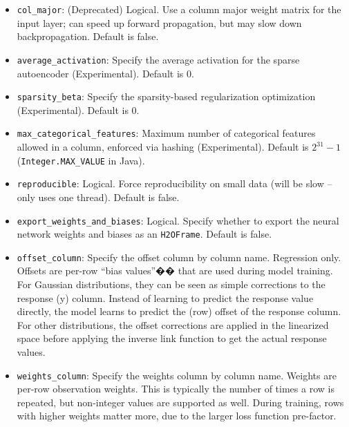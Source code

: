 \begin{itemize}
\item \texttt{col\_major}: (Deprecated) Logical. Use a column major weight matrix for the input layer; can speed up forward propagation, but may slow down backpropagation. Default is false.

\item \texttt{average\_activation}: Specify the average activation for the sparse autoencoder (Experimental).
Default is 0.

\item \texttt{sparsity\_beta}: Specify the sparsity-based regularization optimization (Experimental).  Default is 0. 

\item \texttt{max\_categorical\_features}:  Maximum number of categorical features allowed in a column, enforced via hashing (Experimental).  Default is $2^{31}-1$ (\texttt{Integer.MAX\_VALUE} in Java).

\item \texttt{reproducible}: Logical. Force reproducibility on small data (will be slow -- only uses one thread).  Default is false.

\item \texttt{export\_weights\_and\_biases}: Logical. Specify whether to export the neural network weights and biases as an \texttt{H2OFrame}.  Default is false.

%

\item \texttt{offset\_column}:  Specify the offset column by column name.  Regression only.  Offsets are per-row ``bias values''�� that are used during model training. For Gaussian distributions, they can be seen as simple corrections to the response (y) column. Instead of learning to predict the response value directly, the model learns to predict the (row) offset of the response column. For other distributions, the offset corrections are applied in the linearized space before applying the inverse link function to get the actual response values. 

\item \texttt{weights\_column}: Specify the weights column by column name. Weights are per-row observation weights. This is typically the number of times a row is repeated, but non-integer values are supported as well. During training, rows with higher weights matter more, due to the larger loss function pre-factor.


\end{itemize}
